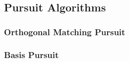 \subsection{Pursuit Algorithms}
\subsubsection{Orthogonal Matching Pursuit}
\subsubsection{Basis Pursuit}
